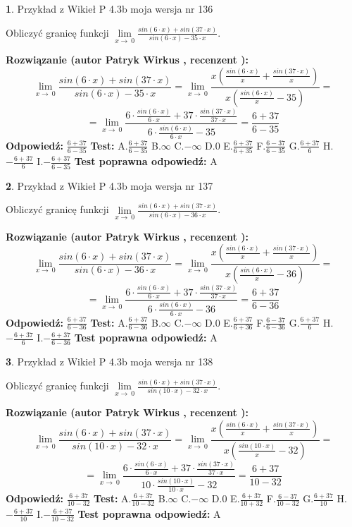 \documentclass[12pt, a4paper]{article}
\theoremstyle{definition} %
\newtheorem{zad}{}
\newcommand{\zadStart}[1]{\begin{zad}#1\newline}
\newcommand{\zadStop}{\end{zad}}
\newcommand{\rozwStart}[2]{\noindent \textbf{Rozwiązanie (autor #1 , recenzent #2): }\newline}
\newcommand{\rozwStop}{\newline}
\newcommand{\odpStart}{\noindent \textbf{Odpowiedź:}\newline}
\newcommand{\odpStop}{\newline}
\newcommand{\testStart}{\noindent \textbf{Test:}\newline}
\newcommand{\testStop}{\newline}
\newcommand{\kluczStart}{\noindent \textbf{Test poprawna odpowiedź:}\newline}
\newcommand{\kluczStop}{\newline}
\begin{document}
\zadStart{Przykład z Wikieł P 4.3b moja wersja nr 136}


Obliczyć granicę funkcji $\lim\limits_{x\to\ 0}\frac{sin(6 \cdot x)+sin(37 \cdot x)}{sin(6 \cdot x)-35 \cdot x}$.
\zadStop
\rozwStart{Patryk Wirkus}{}
$$\lim\limits_{x\to\ 0}\frac{sin(6 \cdot x)+sin(37 \cdot x)}{sin(6 \cdot x)-35 \cdot x}=\lim\limits_{x\to\ 0}\frac{x(\frac{sin(6 \cdot x)}{x}+\frac{sin(37 \cdot x)}{x})}{x(\frac{sin(6 \cdot x)}{x}-35)}=$$
$$=\lim\limits_{x\to\ 0}\frac{6 \cdot \frac{sin(6 \cdot x)}{6 \cdot x}+37 \cdot \frac{sin(37 \cdot x)}{37 \cdot x}}{6 \cdot \frac{sin(6 \cdot x)}{6 \cdot x}-35}=\frac{6+37}{6-35}$$
\rozwStop
\odpStart
$\frac{6+37}{6-35}$
\odpStop
\testStart
A.$\frac{6+37}{6-35}$
B.$\infty$
C.$-\infty$
D.$0$
E.$\frac{6+37}{6+35}$
F.$\frac{6-37}{6-35}$
G.$\frac{6+37}{6}$
H.$-\frac{6+37}{6}$
I.$-\frac{6+37}{6-35}$
\testStop
\kluczStart
A
\kluczStop



\zadStart{Przykład z Wikieł P 4.3b moja wersja nr 137}


Obliczyć granicę funkcji $\lim\limits_{x\to\ 0}\frac{sin(6 \cdot x)+sin(37 \cdot x)}{sin(6 \cdot x)-36 \cdot x}$.
\zadStop
\rozwStart{Patryk Wirkus}{}
$$\lim\limits_{x\to\ 0}\frac{sin(6 \cdot x)+sin(37 \cdot x)}{sin(6 \cdot x)-36 \cdot x}=\lim\limits_{x\to\ 0}\frac{x(\frac{sin(6 \cdot x)}{x}+\frac{sin(37 \cdot x)}{x})}{x(\frac{sin(6 \cdot x)}{x}-36)}=$$
$$=\lim\limits_{x\to\ 0}\frac{6 \cdot \frac{sin(6 \cdot x)}{6 \cdot x}+37 \cdot \frac{sin(37 \cdot x)}{37 \cdot x}}{6 \cdot \frac{sin(6 \cdot x)}{6 \cdot x}-36}=\frac{6+37}{6-36}$$
\rozwStop
\odpStart
$\frac{6+37}{6-36}$
\odpStop
\testStart
A.$\frac{6+37}{6-36}$
B.$\infty$
C.$-\infty$
D.$0$
E.$\frac{6+37}{6+36}$
F.$\frac{6-37}{6-36}$
G.$\frac{6+37}{6}$
H.$-\frac{6+37}{6}$
I.$-\frac{6+37}{6-36}$
\testStop
\kluczStart
A
\kluczStop



\zadStart{Przykład z Wikieł P 4.3b moja wersja nr 138}


Obliczyć granicę funkcji $\lim\limits_{x\to\ 0}\frac{sin(6 \cdot x)+sin(37 \cdot x)}{sin(10 \cdot x)-32 \cdot x}$.
\zadStop
\rozwStart{Patryk Wirkus}{}
$$\lim\limits_{x\to\ 0}\frac{sin(6 \cdot x)+sin(37 \cdot x)}{sin(10 \cdot x)-32 \cdot x}=\lim\limits_{x\to\ 0}\frac{x(\frac{sin(6 \cdot x)}{x}+\frac{sin(37 \cdot x)}{x})}{x(\frac{sin(10 \cdot x)}{x}-32)}=$$
$$=\lim\limits_{x\to\ 0}\frac{6 \cdot \frac{sin(6 \cdot x)}{6 \cdot x}+37 \cdot \frac{sin(37 \cdot x)}{37 \cdot x}}{10 \cdot \frac{sin(10 \cdot x)}{10 \cdot x}-32}=\frac{6+37}{10-32}$$
\rozwStop
\odpStart
$\frac{6+37}{10-32}$
\odpStop
\testStart
A.$\frac{6+37}{10-32}$
B.$\infty$
C.$-\infty$
D.$0$
E.$\frac{6+37}{10+32}$
F.$\frac{6-37}{10-32}$
G.$\frac{6+37}{10}$
H.$-\frac{6+37}{10}$
I.$-\frac{6+37}{10-32}$
\testStop
\kluczStart
A
\kluczStop
\end{document}
